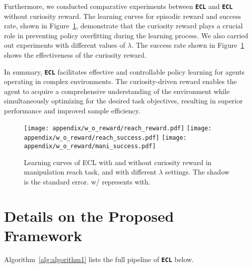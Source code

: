 Furthermore, we conducted comparative experiments between \texttt{\textbf{ECL}} and \texttt{\textbf{ECL}} without curiosity reward. The learning curves for episodic reward and success rate, shown in Figure~\ref{fig:w_o_reward}, demonstrate that the curiosity reward plays a crucial role in preventing policy overfitting during the learning process. We also carried out experiments with different values of $\lambda$. The success rate shown in Figure~\ref{fig:w_o_reward} shows the effectiveness of the curiosity reward.

In summary, \texttt{\textbf{ECL}} facilitates effective and controllable policy learning for agents operating in complex environments. The curiosity-driven reward enables the agent to acquire a comprehensive understanding of the environment while simultaneously optimizing for the desired task objectives, resulting in superior performance and improved sample efficiency.

\begin{figure}[h]
    \centering
    \texttt{[image: appendix/w\_o\_reward/reach\_reward.pdf]}
    \texttt{[image: appendix/w\_o\_reward/reach\_success.pdf]}
    \texttt{[image: appendix/w\_o\_reward/mani\_success.pdf]}
    \caption{Learning curves of ECL with and without curiosity reward in manipulation reach task, and with different $\lambda$ settings. The shadow is the standard error. w/ represents with.}
    \label{fig:w_o_reward}
\end{figure}

\section{Details on the Proposed Framework}
\label{Details on the Proposed Framework}

Algorithm~\ref{alg:algorithm1} lists the full pipeline of \texttt{\textbf{ECL}} below. 


